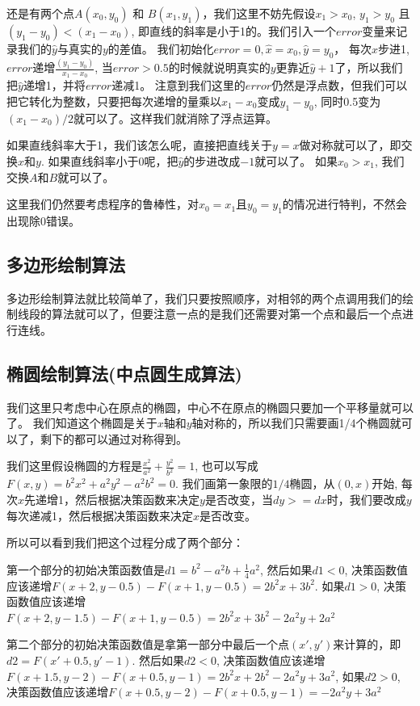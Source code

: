 \documentclass[a4paper,UTF8]{article}
\theoremstyle{definition}
\begin{document}
还是有两个点$A(x_0, y_0)$ 和 $B(x_1, y_1)$，我们这里不妨先假设$x_1 > x_0$, $y_1 > y_0$ 且 $(y_1 - y_0) < (x_1 - x_0)$, 即直线的斜率是小于1的。我们引入一个$error$变量来记录我们的$\hat{y}$与真实的$y$的差值。 我们初始化$error = 0, \hat{x} = x_0, \hat{y} = y_0$， 每次$\hat{x}$步进1, $error$递增$\frac{(y_1 - y_0)}{x_1 - x_0}$, 当$error>0.5$的时候就说明真实的$y$更靠近$\hat{y}+1$了，所以我们把$\hat{y}$递增1，并将$error$递减1。 注意到我们这里的$error$仍然是浮点数，但我们可以把它转化为整数，只要把每次递增的量乘以$x_1 - x_0$变成$y_1 - y_0$, 同时0.5变为$(x_1-x_0)/2$就可以了。这样我们就消除了浮点运算。

如果直线斜率大于1，我们该怎么呢，直接把直线关于$y=x$做对称就可以了，即交换$x$和$y$. 如果直线斜率小于0呢，把$\hat{y}$的步进改成$-1$就可以了。 如果$x_0 > x_1$, 我们交换$A$和$B$就可以了。

这里我们仍然要考虑程序的鲁棒性，对$x_0 = x_1$且$y_0 = y_1$的情况进行特判，不然会出现除0错误。


\subsection{多边形绘制算法}
多边形绘制算法就比较简单了，我们只要按照顺序，对相邻的两个点调用我们的绘制线段的算法就可以了，但要注意一点的是我们还需要对第一个点和最后一个点进行连线。

\subsection{椭圆绘制算法(中点圆生成算法)}
我们这里只考虑中心在原点的椭圆，中心不在原点的椭圆只要加一个平移量就可以了。 我们知道这个椭圆是关于$x$轴和$y$轴对称的，所以我们只需要画1/4个椭圆就可以了，剩下的都可以通过对称得到。

我们这里假设椭圆的方程是$\frac{x^2}{a^2} + \frac{y^2}{b^2} = 1$, 也可以写成$F(x, y) = b^2 x^2 + a^2 y^2 - a^2 b^2  = 0$. 我们画第一象限的$1/4$椭圆，从$(0, x)$开始, 每次$x$先递增1，然后根据决策函数来决定$y$是否改变，当$dy >= dx$时，我们要改成$y$每次递减1，然后根据决策函数来决定$x$是否改变。


所以可以看到我们把这个过程分成了两个部分：

第一个部分的初始决策函数值是$d1 = b^2 - a^2 b + \frac{1}{4} a^2$, 然后如果$d1<0$, 决策函数值应该递增$F(x+2, y-0.5) - F(x+1, y-0.5) = 2b^2x + 3b^2$. 如果$d1>0$, 决策函数值应该递增$F(x+2, y-1.5) - F(x+1, y-0.5) = 2b^2x + 3b^2 - 2a^2 y + 2a^2$ 

第二个部分的初始决策函数值是拿第一部分中最后一个点$(x' , y')$来计算的，即$d2 = F(x'+0.5, y'-1)$. 然后如果$d2<0$, 决策函数值应该递增$F(x+1.5, y-2) - F(x+0.5, y-1) = 2b^2x + 2b^2 - 2a^2 y + 3 a^2 $, 如果$d2 >0 $, 决策函数值应该递增$F(x+0.5, y-2) - F(x+0.5, y-1) = -2a^2 y + 3 a^2$
\end{document}
